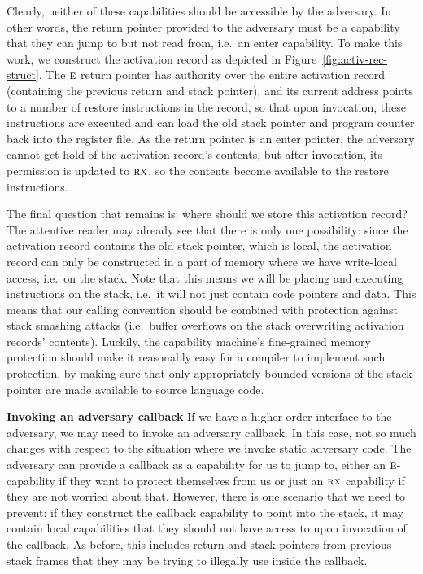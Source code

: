\documentclass[format=acmsmall, review=true, screen=true]{acmart}
\renewcommand{\figurename}{Figure}
\newcommand{\plainperm}[1]{\textsc{#1}}
\newcommand{\exec}{\plainperm{rx}}
\newcommand{\entry}{\plainperm{e}}
\begin{document}
Clearly, neither of these capabilities should be accessible by the adversary. In
other words, the return pointer provided to the adversary must be a capability
that they can jump to but not read from, i.e.\ an enter capability. To make this
work, we construct the activation record as depicted in
\figurename~\ref{fig:activ-rec-struct}. The $\entry$ return pointer has authority
over the entire activation record (containing the previous return and stack
pointer), and its current address points to a number of restore instructions in
the record, so that upon invocation, these instructions are executed and can
load the old stack pointer and program counter back into the register file. As
the return pointer is an enter pointer, the adversary cannot get hold of the
activation record's contents, but after invocation, its permission is updated to
$\exec$, so the contents become available to the restore instructions.

The final question that remains is: where should we store this activation
record? The attentive reader may already see that there is only one possibility:
since the activation record contains the old stack pointer, which is local, the
activation record can only be constructed in a part of memory where we have
write-local access, i.e.\ on the stack. Note that this means we will be placing
and executing instructions on the stack, i.e.\ it will not just contain code
pointers and data. This means that our calling convention should be combined
with protection against stack smashing attacks (i.e.\ buffer overflows on the
stack overwriting activation records' contents). Luckily, the capability
machine's fine-grained memory protection should make it reasonably easy for a
compiler to implement such protection, by making sure that only appropriately
bounded versions of the stack pointer are made available to source language
code.

\textbf{Invoking an adversary callback} If we have a higher-order interface to
the adversary, we may need to invoke an adversary callback. In this case, not so
much changes with respect to the situation where we invoke static adversary
code. The adversary can provide a callback as a capability for us to jump to,
either an $\entry$-capability if they want to protect themselves from us or just
an $\exec$ capability if they are not worried about that. However, there is one
scenario that we need to prevent: if they construct the callback capability to
point into the stack, it may contain local capabilities that they should not
have access to upon invocation of the callback. As before, this includes return
and stack pointers from previous stack frames that they may be
trying to illegally use inside the callback.
\end{document}
